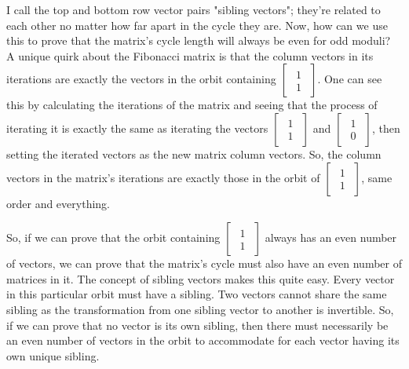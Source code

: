 \documentclass[a4paper, 12pt, reqno]{amsart}
\begin{document}
			I call the top and bottom row vector pairs "sibling vectors"; they're related to each
			other no matter how far apart in the cycle they are. Now, how can we use this to prove that the
			matrix's cycle length will always be even for odd moduli? A unique quirk about the Fibonacci
			matrix is that the column vectors in its iterations are exactly the vectors in the orbit containing
			$
				\begin{bmatrix}
					\begin{smallmatrix}
						1 \\
						1
					\end{smallmatrix}
				\end{bmatrix}
			$.
			One can see this by calculating the iterations of the matrix and seeing that the process of iterating
			it is exactly the same as iterating the vectors 
			$
				\begin{bmatrix}
					\begin{smallmatrix}
						1 \\
						1
					\end{smallmatrix}
				\end{bmatrix}
			$
			and
			$
				\begin{bmatrix}
					\begin{smallmatrix}
						1 \\
						0
					\end{smallmatrix}
				\end{bmatrix}
			$,
			then setting the iterated vectors as the new matrix column vectors. So, the column vectors in the matrix's
			iterations are exactly those in the orbit of
			$
				\begin{bmatrix}
					\begin{smallmatrix}
						1 \\
						1
					\end{smallmatrix}
				\end{bmatrix}
			$,
			same order and everything.
			
			So, if we can prove that the orbit containing
			$
				\begin{bmatrix}
					\begin{smallmatrix}
						1 \\
						1
					\end{smallmatrix}
				\end{bmatrix}
			$
			always has an even number of vectors, we can prove that the matrix's cycle must also have an even number
			of matrices in it. The concept of sibling vectors makes this quite easy. Every vector in this
			particular orbit must have a sibling. Two vectors cannot share the same sibling as the transformation
			from one sibling vector to another is invertible. So, if we can prove that no vector is its own sibling,
			then there must necessarily be an even number of vectors in the orbit to accommodate for each vector
			having its own unique sibling.
			
\end{document}
